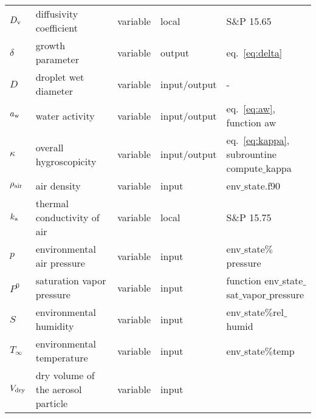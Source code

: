 \documentclass{article}
\begin{document}
\begin{tabular}{p{1cm} p{4cm} p{1.5cm} l l}
\hline
$D_{\rm v}$     & diffusivity coefficient   &  variable & local &  S$\&$P 15.65  \\
$\delta$  & growth parameter &  variable & output & eq.~\ref{eq:delta}\\
$D$     &  droplet wet diameter  & variable  & input/output &   -   \\
$a_{\rm w}$  & water activity  &variable & input/output & eq.~\ref{eq:aw},  function aw  \\
$\kappa$      &  overall hygroscopicity   &  variable & input/output  &  eq.~\ref{eq:kappa}, subrountine compute$\_$kappa   \\
$ \rho_{\rm air}$    &  air density   &  variable  & input  &   env$\_$state.f90   \\
$k_{\rm a} $     & thermal conductivity of air    &  variable & local &   S$\&$P 15.75   \\
$ p $     &  environmental air pressure &  variable  & input  &  env$\_$state$\%$pressure  \\
$ P^{0}  $   & saturation vapor pressure &  variable & input  &  function env$\_$state$\_$sat$\_$vapor$\_$pressure  \\
$S $     &  environmental humidity  &  variable  & input  &  env$\_$state$\%$rel$\_$humid  \\
$ T_{\infty}$     &  environmental temperature  &  variable  & input  &  env$\_$state$\%$temp  \\
$ V_{\rm dry}$       & dry volume of the aerosol particle   &  variable  & input  &    \\

\hline 
\end{tabular}
\end{document}

